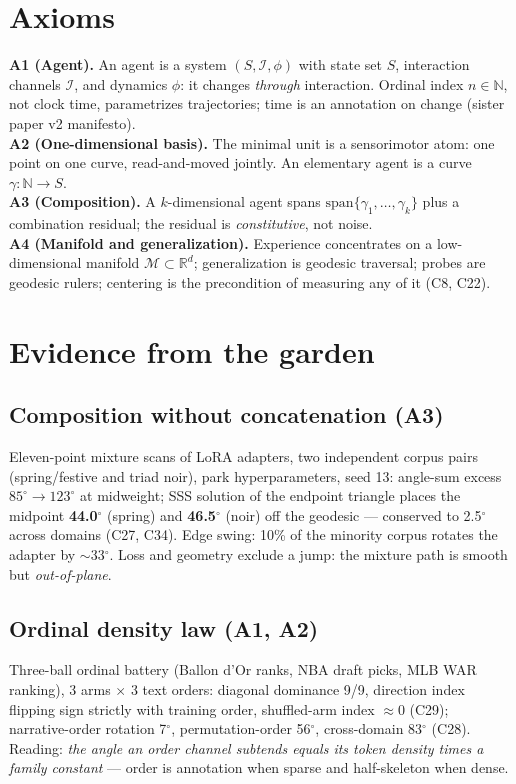 \documentclass[11pt]{article}
\newcommand{\R}{\mathbb{R}}
\begin{document}
\section{Axioms}
\textbf{A1 (Agent).} An agent is a system $(S,\mathcal{I},\phi)$ with state set $S$,
interaction channels $\mathcal{I}$, and dynamics $\phi$: it changes \emph{through} interaction.
Ordinal index $n\in\mathbb{N}$, not clock time, parametrizes trajectories; time is an
annotation on change (sister paper v2 manifesto).\\
\textbf{A2 (One-dimensional basis).} The minimal unit is a sensorimotor atom: one point
on one curve, read-and-moved jointly. An elementary agent is a curve $\gamma:\mathbb{N}\to S$.\\
\textbf{A3 (Composition).} A $k$-dimensional agent spans $\mathrm{span}\{\gamma_1,\dots,\gamma_k\}$
plus a combination residual; the residual is \emph{constitutive}, not noise.\\
\textbf{A4 (Manifold and generalization).} Experience concentrates on a low-dimensional
manifold $\mathcal{M}\subset\R^d$; generalization is geodesic traversal; probes are
geodesic rulers; centering is the precondition of measuring any of it (C8, C22).

\section{Evidence from the garden}
\subsection{Composition without concatenation (A3)}
Eleven-point mixture scans of LoRA adapters, two independent corpus pairs
(spring/festive and triad noir), park hyperparameters, seed 13:
angle-sum excess $85^\circ\!\to\!123^\circ$ at midweight; SSS solution of the
endpoint triangle places the midpoint \textbf{44.0$^\circ$} (spring) and \textbf{46.5$^\circ$}
(noir) off the geodesic --- conserved to 2.5$^\circ$ across domains (C27, C34).
Edge swing: 10\% of the minority corpus rotates the adapter by $\sim$33$^\circ$.
Loss and geometry exclude a jump: the mixture path is smooth but \emph{out-of-plane}.

\subsection{Ordinal density law (A1, A2)}
Three-ball ordinal battery (Ballon d'Or ranks, NBA draft picks, MLB WAR ranking),
3 arms $\times$ 3 text orders: diagonal dominance 9/9, direction index flipping
sign strictly with training order, shuffled-arm index $\approx 0$ (C29);
narrative-order rotation 7$^\circ$, permutation-order 56$^\circ$, cross-domain 83$^\circ$
(C28). Reading: \emph{the angle an order channel subtends equals its token density
times a family constant} --- order is annotation when sparse and half-skeleton when dense.
\end{document}
